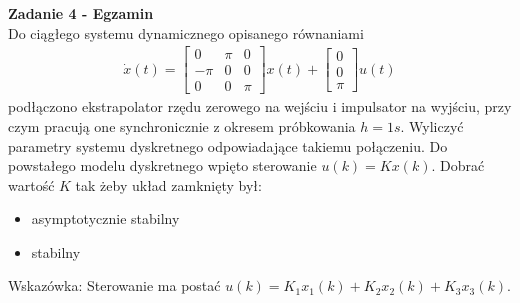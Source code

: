 \documentclass[a4paper,11pt]{article}
\begin{document}
\begin{framed}
\textbf{Zadanie 4 - Egzamin} \\ 
Do ciągłego systemu dynamicznego opisanego równaniami
\begin{align*}
\dot{x}(t)=
\begin{bmatrix}
0 & \pi & 0 \\
-\pi & 0 & 0 \\
0 & 0 & \pi
\end{bmatrix}
x(t) + 
\begin{bmatrix}
0 \\
0 \\
\pi 
\end{bmatrix}
u(t)
\end{align*}
podłączono ekstrapolator rzędu zerowego na wejściu i impulsator na wyjściu, przy czym pracują one synchronicznie z okresem próbkowania \( h = 1s \). Wyliczyć parametry systemu dyskretnego odpowiadające takiemu połączeniu. Do powstałego modelu dyskretnego wpięto sterowanie \( u(k) = Kx(k) \). Dobrać wartość \( K \) tak żeby układ zamknięty był:
\begin{itemize}
\item asymptotycznie stabilny
\item stabilny
\end{itemize}
Wskazówka: Sterowanie ma postać \( u(k) = K_1x_1(k)+K_2x_2(k)+K_3x_3(k) \).
\end{framed}

\newpage
\end{document}
